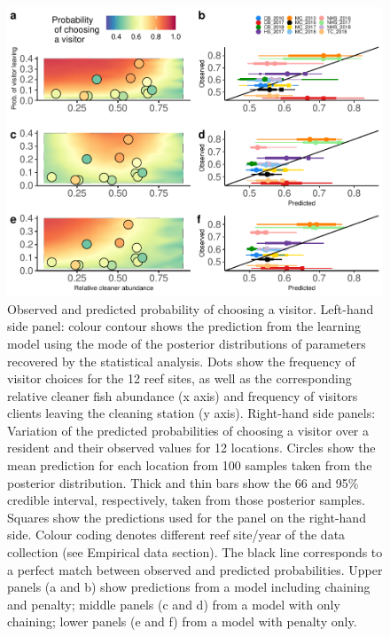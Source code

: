 \documentclass[10pt,letterpaper]{article}
\begin{document}
\begin{figure}
\includegraphics[width=1\linewidth]{manuscript_PLOS_files/figure-latex/pred-1} \caption{Observed and predicted probability of choosing a visitor. Left-hand side panel: colour contour shows the prediction from the learning model using the mode of the posterior distributions of parameters recovered by the statistical analysis. Dots show the frequency of visitor choices for the 12 reef sites, as well as the corresponding relative cleaner fish abundance (x axis) and frequency of visitors clients leaving the cleaning station (y axis). Right-hand side panels: Variation of the predicted probabilities  of choosing a visitor over a resident and their observed values for 12 locations. Circles show the mean prediction for each location from 100 samples taken from the posterior distribution. Thick and thin bars show the 66 and 95\% credible interval, respectively, taken from those posterior samples. Squares show the predictions used for the panel on the right-hand side. Colour coding denotes different reef site/year of the data collection (see Empirical data section). The black line corresponds to a perfect match between observed and predicted probabilities. Upper panels (a and b) show predictions from a model including chaining and penalty; middle panels (c and d) from a  model with only chaining; lower panels (e and f) from a model with penalty only.}\label{fig:pred}
\end{figure}
\end{document}
